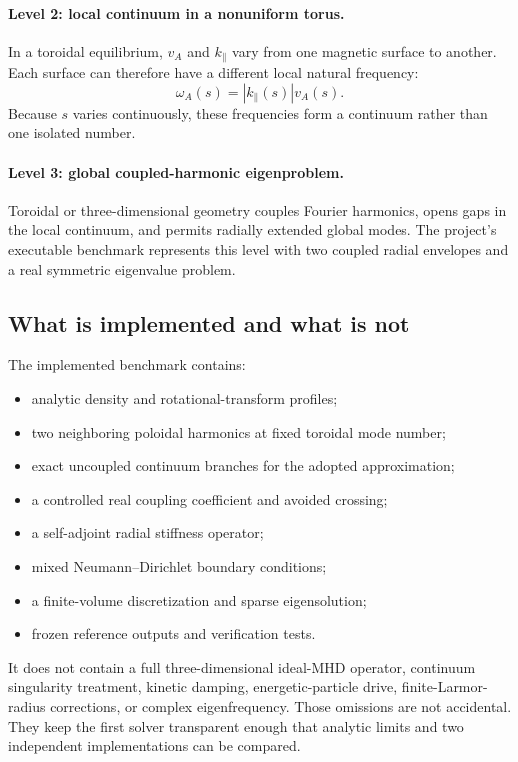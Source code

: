 \paragraph{Level 2: local continuum in a nonuniform torus.}
In a toroidal equilibrium, $v_A$ and $k_\parallel$ vary from one magnetic surface to another. Each surface can therefore have a different local natural frequency:
\begin{equation}
\omega_A(s)=|k_\parallel(s)|v_A(s).
\end{equation}
Because $s$ varies continuously, these frequencies form a continuum rather than one isolated number.

\paragraph{Level 3: global coupled-harmonic eigenproblem.}
Toroidal or three-dimensional geometry couples Fourier harmonics, opens gaps in the local continuum, and permits radially extended global modes. The project's executable benchmark represents this level with two coupled radial envelopes and a real symmetric eigenvalue problem.

\subsection{What is implemented and what is not}
The implemented benchmark contains:
\begin{itemize}[leftmargin=1.6em]
\item analytic density and rotational-transform profiles;
\item two neighboring poloidal harmonics at fixed toroidal mode number;
\item exact uncoupled continuum branches for the adopted approximation;
\item a controlled real coupling coefficient and avoided crossing;
\item a self-adjoint radial stiffness operator;
\item mixed Neumann--Dirichlet boundary conditions;
\item a finite-volume discretization and sparse eigensolution;
\item frozen reference outputs and verification tests.
\end{itemize}
It does not contain a full three-dimensional ideal-MHD operator, continuum singularity treatment, kinetic damping, energetic-particle drive, finite-Larmor-radius corrections, or complex eigenfrequency. Those omissions are not accidental. They keep the first solver transparent enough that analytic limits and two independent implementations can be compared.

